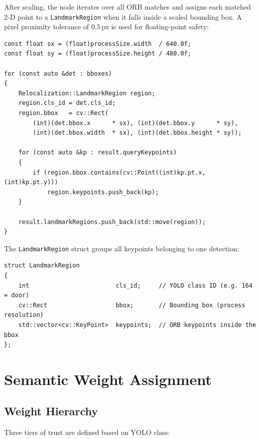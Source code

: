 \documentclass[12pt,a4paper]{article}
\begin{document}
After scaling, the node iterates over all ORB matches and assigns each matched 2-D
point to a \texttt{LandmarkRegion} when it falls inside a scaled bounding box. A
pixel proximity tolerance of $0.5$\,px is used for floating-point safety:

\begin{lstlisting}[style=cpp,
  caption={Landmark segmentation ---
           \texttt{relocalization\_node.cpp}, lines\,171--203}]
const float sx = (float)processSize.width  / 640.0f;
const float sy = (float)processSize.height / 480.0f;

for (const auto &det : bboxes)
{
    Relocalization::LandmarkRegion region;
    region.cls_id = det.cls_id;
    region.bbox   = cv::Rect(
        (int)(det.bbox.x      * sx), (int)(det.bbox.y      * sy),
        (int)(det.bbox.width  * sx), (int)(det.bbox.height * sy));

    for (const auto &kp : result.queryKeypoints)
    {
        if (region.bbox.contains(cv::Point((int)kp.pt.x, (int)kp.pt.y)))
            region.keypoints.push_back(kp);
    }

    result.landmarkRegions.push_back(std::move(region));
}
\end{lstlisting}

The \texttt{LandmarkRegion} struct groups all keypoints belonging to one detection:

\begin{lstlisting}[style=cpp,
  caption={\texttt{LandmarkRegion} struct ---
           \texttt{relocalization.h}, lines\,21--27}]
struct LandmarkRegion
{
    int                        cls_id;     // YOLO class ID (e.g. 164 = door)
    cv::Rect                   bbox;       // Bounding box (process resolution)
    std::vector<cv::KeyPoint>  keypoints;  // ORB keypoints inside the bbox
};
\end{lstlisting}

\section{Semantic Weight Assignment}

\subsection{Weight Hierarchy}

Three tiers of trust are defined based on YOLO class:
\end{document}

